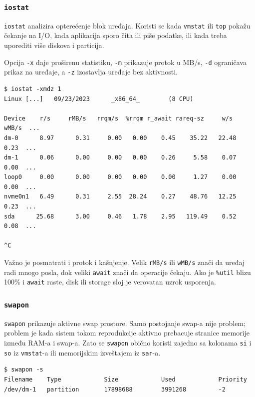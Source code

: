 \subsubsection{\texorpdfstring{\texttt{iostat}}{iostat}}\label{iostat}

\texttt{iostat} analizira opterećenje blok uređaja. Koristi se kada \texttt{vmstat} ili \texttt{top} pokažu čekanje na I/O, kada aplikacija sporo čita ili piše podatke, ili kada treba uporediti više diskova i particija.

Opcija \texttt{-x} daje proširenu statistiku, \texttt{-m} prikazuje protok u MB/s, \texttt{-d} ograničava prikaz na uređaje, a \texttt{-z} izostavlja uređaje bez aktivnosti.

\begin{verbatim}
$ iostat -xmdz 1
Linux [...]   09/23/2023      _x86_64_        (8 CPU)

Device    r/s     rMB/s   rrqm/s  %rrqm r_await rareq-sz     w/s     wMB/s  ...
dm-0      8.97      0.31     0.00   0.00    0.45    35.22   22.48      0.23  ...
dm-1      0.06      0.00     0.00   0.00    0.26     5.58    0.07      0.00  ...
loop0     0.00      0.00     0.00   0.00    0.00     1.27    0.00      0.00  ...
nvme0n1   6.49      0.31     2.55  28.24    0.27    48.76   12.25      0.23  ...
sda      25.68      3.00     0.46   1.78    2.95   119.49    0.52      0.08  ...

^C
\end{verbatim}

Važno je posmatrati i protok i kašnjenje. Velik \texttt{rMB/s} ili \texttt{wMB/s} znači da uređaj radi mnogo posla, dok veliki \texttt{await} znači da operacije čekaju. Ako je \texttt{\%util} blizu 100\% i \texttt{await} raste, disk ili storage sloj je verovatan uzrok usporenja.

\subsubsection{\texorpdfstring{\texttt{swapon}}{swapon}}\label{swapon}

\texttt{swapon} prikazuje aktivne swap prostore. Samo postojanje swap-a nije problem; problem je kada sistem tokom reprodukcije aktivno prebacuje stranice memorije između RAM-a i swap-a. Zato se \texttt{swapon} obično koristi zajedno sa kolonama \texttt{si} i \texttt{so} iz \texttt{vmstat}-a ili memorijskim izveštajem iz \texttt{sar}-a.

\begin{verbatim}
$ swapon -s
Filename    Type            Size            Used            Priority
/dev/dm-1   partition       17898688        3991268         -2
\end{verbatim}

